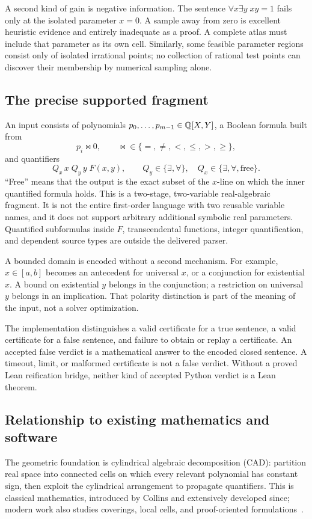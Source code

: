 A second kind of gain is negative information. The sentence $\forall x\exists y\;xy=1$ fails only at the isolated parameter $x=0$. A sample away from zero is excellent heuristic evidence and entirely inadequate as a proof. A complete atlas must include that parameter as its own cell. Similarly, some feasible parameter regions consist only of isolated irrational points; no collection of rational test points can discover their membership by numerical sampling alone.

\subsection{The precise supported fragment}
\label{sec:fragment}
An input consists of polynomials $p_0,\ldots,p_{m-1}\in\mathbb Q[X,Y]$, a Boolean formula built from
\[
 p_i\mathrel{\bowtie}0,\qquad
 \bowtie\in\{=,\ne,<,\le,>,\ge\},
\]
and quantifiers
\[
 Q_x\,x\;Q_y\,y\;F(x,y),\qquad
 Q_y\in\{\exists,\forall\},\quad
 Q_x\in\{\exists,\forall,\text{free}\}.
\]
``Free'' means that the output is the exact subset of the $x$-line on which the inner quantified formula holds. This is a two-stage, two-variable real-algebraic fragment. It is not the entire first-order language with two reusable variable names, and it does not support arbitrary additional symbolic real parameters. Quantified subformulas inside $F$, transcendental functions, integer quantification, and dependent source types are outside the delivered parser.

A bounded domain is encoded without a second mechanism. For example, $x\in[a,b]$ becomes an antecedent for universal $x$, or a conjunction for existential $x$. A bound on existential $y$ belongs in the conjunction; a restriction on universal $y$ belongs in an implication. That polarity distinction is part of the meaning of the input, not a solver optimization.

The implementation distinguishes a valid certificate for a true sentence, a valid certificate for a false sentence, and failure to obtain or replay a certificate. An accepted false verdict is a mathematical answer to the encoded closed sentence. A timeout, limit, or malformed certificate is not a false verdict. Without a proved Lean reification bridge, neither kind of accepted Python verdict is a Lean theorem.

\subsection{Relationship to existing mathematics and software}
The geometric foundation is cylindrical algebraic decomposition (CAD): partition real space into connected cells on which every relevant polynomial has constant sign, then exploit the cylindrical arrangement to propagate quantifiers. This is classical mathematics, introduced by Collins and extensively developed since; modern work also studies coverings, local cells, and proof-oriented formulations~\cite{collins,england,nalbach-cell,nalbach-cover}.

